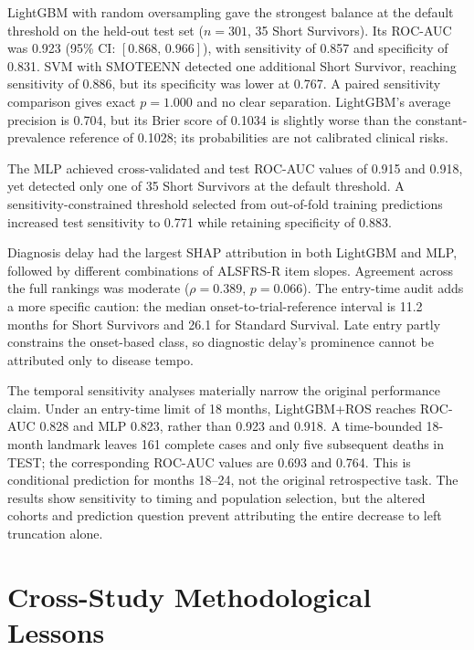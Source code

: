 LightGBM with random oversampling gave the strongest balance at the default threshold on the held-out test set ($n=301$, 35 Short Survivors). Its \gls{ROC-AUC} was 0.923 (95\% \gls{CI}: $[0.868,\,0.966]$), with sensitivity of 0.857 and specificity of 0.831. SVM with SMOTEENN detected one additional Short Survivor, reaching sensitivity of 0.886, but its specificity was lower at 0.767. A paired sensitivity comparison gives exact $p=1.000$ and no clear separation. LightGBM's average precision is 0.704, but its Brier score of 0.1034 is slightly worse than the constant-prevalence reference of 0.1028; its probabilities are not calibrated clinical risks.

The MLP achieved cross-validated and test \gls{ROC-AUC} values of 0.915 and 0.918, yet detected only one of 35 Short Survivors at the default threshold. A sensitivity-constrained threshold selected from out-of-fold training predictions increased test sensitivity to 0.771 while retaining specificity of 0.883.

Diagnosis delay had the largest \gls{SHAP} attribution in both LightGBM and MLP, followed by different combinations of \gls{ALSFRS-R} item slopes. Agreement across the full rankings was moderate ($\rho=0.389$, $p=0.066$). The entry-time audit adds a more specific caution: the median onset-to-trial-reference interval is 11.2 months for Short Survivors and 26.1 for Standard Survival. Late entry partly constrains the onset-based class, so diagnostic delay's prominence cannot be attributed only to disease tempo.

The temporal sensitivity analyses materially narrow the original performance claim. Under an entry-time limit of 18 months, LightGBM+ROS reaches ROC-AUC 0.828 and MLP 0.823, rather than 0.923 and 0.918. A time-bounded 18-month landmark leaves 161 complete cases and only five subsequent deaths in TEST; the corresponding ROC-AUC values are 0.693 and 0.764. This is conditional prediction for months 18--24, not the original retrospective task. The results show sensitivity to timing and population selection, but the altered cohorts and prediction question prevent attributing the entire decrease to left truncation alone.

\section{Cross-Study Methodological Lessons}
\label{sec:conclusion_lessons}

